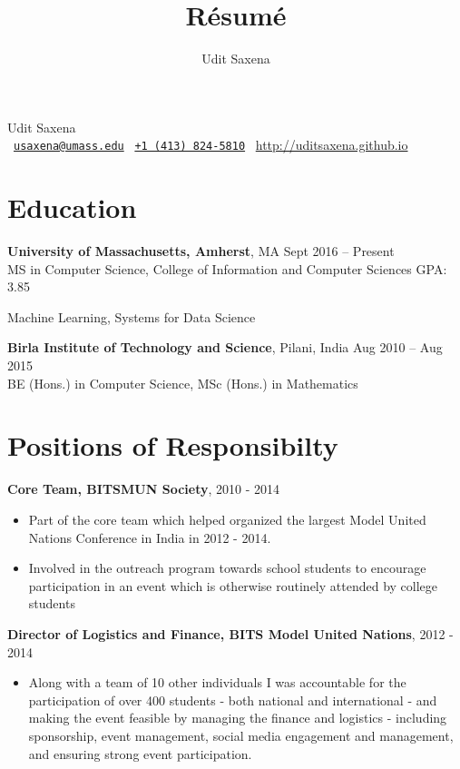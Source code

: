 \documentclass[letterpaper]{article}
\title{R\'esum\'e}
\author{Udit Saxena}
\begin{document}
\pagecolor{white}
\begin{center}
\huge
Udit Saxena\\
\small
\faEnvelope~\href{mailto:usaxena@umass.edu}{\nolinkurl{usaxena@umass.edu}}
\faPhone~\href{tel:14138245810}{\texttt{+1 (413) 824-5810}}
\faGlobe~\url{http://uditsaxena.github.io}
\normalsize
\end{center}

\section*{Education}
\vspace{-1mm}
\textbf{University of Massachusetts, Amherst}, MA \hfill Sept 2016 --
    Present\\
MS in Computer Science, College of Information and Computer Sciences \hfill GPA: 3.85
\vspace{-2mm}
\begin{description}[leftmargin=!, labelwidth=\widthof{Coursework },
        font=\normalfont]
    \item[Coursework:] Machine Learning,
                        Systems for Data Science
\end{description}
\vspace{-0.5mm}
\textbf{Birla Institute of Technology and Science}, Pilani, India \hfill
    Aug 2010 -- Aug 2015\\
BE (Hons.) in Computer Science,
MSc (Hons.) in Mathematics

\section*{Positions of Responsibilty}
\textbf{Core Team, BITSMUN Society},  \hfill
2010 - 2014
\vspace{-2mm}
\begin{itemize}
\item Part of the core team which helped organized the largest Model United Nations Conference in India in 2012 - 2014. 
\vspace{-2mm}
\item Involved in the outreach program towards school students to encourage participation in an event which is otherwise routinely attended by college students
\end{itemize}
\textbf{Director of Logistics and Finance, BITS Model United Nations},  \hfill
2012 - 2014
\vspace{-2mm}
\begin{itemize}
\item  Along with a team of 10 other individuals I was accountable for the participation of over 400 students - both national and international - and making the event feasible by managing the finance and logistics - including sponsorship, event management, social media engagement and management, and ensuring strong event participation. 
\end{itemize}
\end{document}
